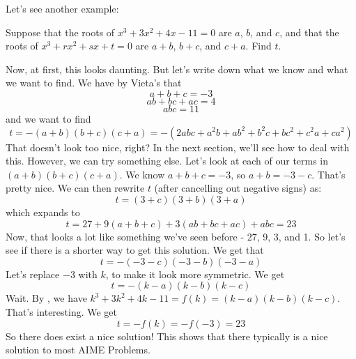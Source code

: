 \documentclass[11pt,titlepage]{scrartcl}
\begin{document}
Let's see another example:
\begin{example}
Suppose that the roots of $x^3+3x^2+4x-11=0$ are $a$, $b$, and $c$, and that the roots of $x^3+rx^2+sx+t=0$ are $a+b$, $b+c$, and $c+a$. Find $t$.
\end{example}
Now, at first, this looks daunting. But let's write down what we know and what we want to find. We have by Vieta's that
\[a+b+c=-3\]
\[ab+bc+ac=4\]
\[abc=11\]
and we want to find
\[t=-(a+b)(b+c)(c+a)=-(2abc+a^2b+ab^2+b^2c+bc^2+c^2a+ca^2)\]
That doesn't look too nice, right? In the next section, we'll see how to deal with this. However, we can try something else. Let's look at each of our terms in $(a+b)(b+c)(c+a)$. We know $a+b+c=-3$, so $a+b=-3-c$. That's pretty nice. We can then rewrite $t$ (after cancelling out negative signs) as:
\[t=(3+c)(3+b)(3+a)\]
which expands to
\[t=27+9(a+b+c)+3(ab+bc+ac)+abc=\boxed{23}\]
Now, that looks a lot like something we've seen before - 27, 9, 3, and 1. So let's see if there is a shorter way to get this solution. We get that
\[t=-(-3-c)(-3-b)(-3-a)\]
Let's replace $-3$ with $k$, to make it look more symmetric. We get
\[t=-(k-a)(k-b)(k-c)\]
Wait. By , we have $k^3+3k^2+4k-11=f(k)=(k-a)(k-b)(k-c)$. That's interesting. We get
\[t=-f(k)=-f(-3)=\boxed{23}\]
So there does exist a nice solution! This shows that there typically is a nice solution to most AIME Problems.
\end{document}
